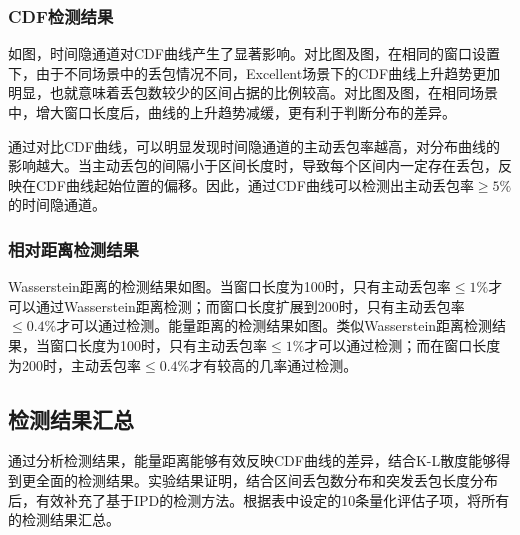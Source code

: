 \subsubsection{CDF检测结果}
\label{chap:analyze:result:window:cdf}

如图，时间隐通道对CDF曲线产生了显著影响。对比图及图，在相同的窗口设置下，由于不同场景中的丢包情况不同，Excellent场景下的CDF曲线上升趋势更加明显，也就意味着丢包数较少的区间占据的比例较高。对比图及图，在相同场景中，增大窗口长度后，曲线的上升趋势减缓，更有利于判断分布的差异。

通过对比CDF曲线，可以明显发现时间隐通道的主动丢包率越高，对分布曲线的影响越大。当主动丢包的间隔小于区间长度时，导致每个区间内一定存在丢包，反映在CDF曲线起始位置的偏移。因此，通过CDF曲线可以检测出主动丢包率$\ge5\%$的时间隐通道。

\subsubsection{相对距离检测结果}
\label{chap:analyze:result:window:distance}

Wasserstein距离的检测结果如图。当窗口长度为100时，只有主动丢包率$\le 1\%$才可以通过Wasserstein距离检测；而窗口长度扩展到200时，只有主动丢包率$\le 0.4\%$才可以通过检测。能量距离的检测结果如图。类似Wasserstein距离检测结果，当窗口长度为100时，只有主动丢包率$\le 1\%$才可以通过检测；而在窗口长度为200时，主动丢包率$\le 0.4\%$才有较高的几率通过检测。

\subsection{检测结果汇总}
通过分析检测结果，能量距离能够有效反映CDF曲线的差异，结合K-L散度能够得到更全面的检测结果。实验结果证明，结合区间丢包数分布和突发丢包长度分布后，有效补充了基于IPD的检测方法。根据表中设定的10条量化评估子项，将所有的检测结果汇总。

